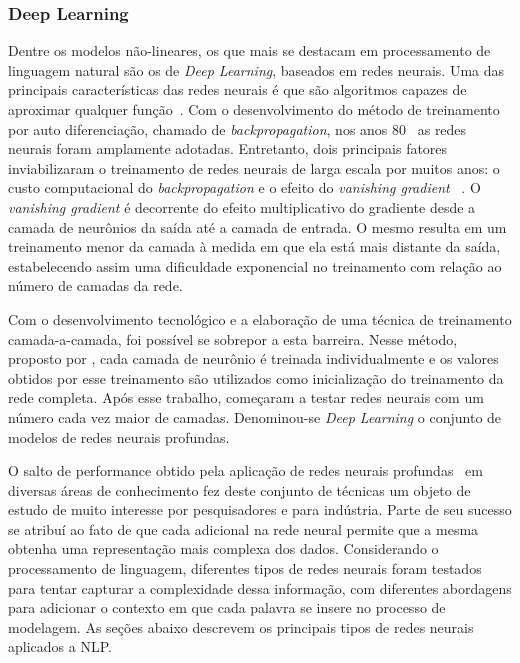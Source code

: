 \subsubsection{Deep Learning}

Dentre os modelos não-lineares, os que mais se destacam em processamento de
linguagem natural são os de \textit{Deep Learning}, baseados em redes neurais.
Uma das principais características das redes neurais é que são algoritmos
capazes de aproximar qualquer função~\cite{hornik89}.
Com o desenvolvimento do método de treinamento por auto diferenciação, chamado
de \textit{backpropagation}, nos anos 80~\cite{werbos82} as redes neurais
foram amplamente adotadas.
Entretanto, dois principais fatores inviabilizaram o treinamento de redes
neurais de larga escala por muitos anos: o custo computacional do
\textit{backpropagation} e o efeito do \textit{vanishing gradient}~
\cite{hochreiter98}.
O \textit{vanishing gradient} é decorrente do efeito multiplicativo do
gradiente desde a camada de neurônios da saída até a camada de entrada.
O mesmo resulta em um treinamento menor da camada à medida em que ela está
mais distante da saída, estabelecendo assim uma dificuldade exponencial no
treinamento com relação ao número de camadas da rede.

Com o desenvolvimento tecnológico e a elaboração de uma técnica de treinamento
camada-a-camada, foi possível se sobrepor a esta barreira.
Nesse método, proposto por \citet{hinton06}, cada camada de neurônio
é treinada individualmente e os valores obtidos por esse treinamento são
utilizados como inicialização do treinamento da rede completa.
Após esse trabalho, começaram a testar redes neurais com um número cada vez
maior de camadas.
Denominou-se \textit{Deep Learning} o conjunto de modelos de redes neurais
profundas.

O salto de performance obtido pela aplicação de redes neurais
profundas~\cite{lecun15} em diversas áreas de conhecimento fez deste conjunto de
técnicas um objeto de estudo de muito interesse por pesquisadores e para indústria.
Parte de seu sucesso se atribuí ao fato de que cada adicional na rede neural
permite que a mesma obtenha uma representação mais complexa dos dados.
Considerando o processamento de linguagem, diferentes tipos de redes neurais
foram testados para tentar capturar a complexidade dessa informação,
com diferentes abordagens para adicionar o contexto em que cada palavra se
insere no processo de modelagem.
As seções abaixo descrevem os principais tipos de redes neurais aplicados a NLP.

